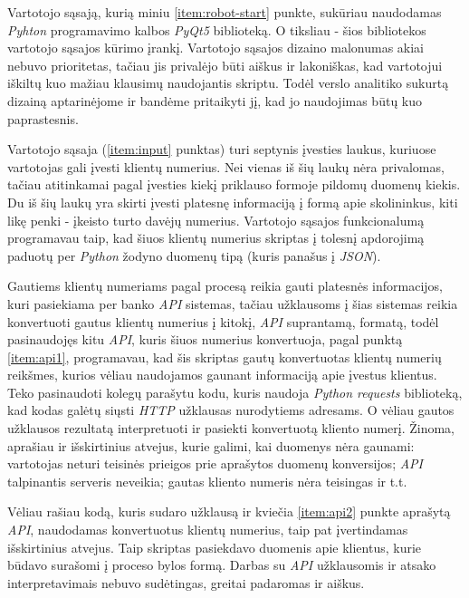 \documentclass{VUMIFPSBakPrakAt}
\begin{document}
\vspace{10pt}
\par
Vartotojo sąsają, kurią miniu \ref{item:robot-start} punkte, sukūriau naudodamas \textit{Pyhton} programavimo kalbos \textit{PyQt5} biblioteką. O tiksliau - šios bibliotekos vartotojo sąsajos kūrimo įrankį. Vartotojo sąsajos dizaino malonumas akiai nebuvo prioritetas, tačiau jis privalėjo būti aiškus ir lakoniškas, kad vartotojui iškiltų kuo mažiau klausimų naudojantis skriptu. Todėl verslo analitiko sukurtą dizainą aptarinėjome ir bandėme pritaikyti jį, kad jo naudojimas būtų kuo paprastesnis.
\par
Vartotojo sąsaja (\ref{item:input} punktas) turi septynis įvesties laukus, kuriuose vartotojas gali įvesti klientų numerius. Nei vienas iš šių laukų nėra privalomas, tačiau atitinkamai pagal įvesties kiekį priklauso formoje pildomų duomenų kiekis. Du iš šių laukų yra skirti įvesti platesnę informaciją į formą apie skolininkus, kiti likę penki - įkeisto turto davėjų numerius. Vartotojo sąsajos funkcionalumą programavau taip, kad šiuos klientų numerius skriptas į tolesnį apdorojimą paduotų per \textit{Python} žodyno duomenų tipą (kuris panašus į \textit{JSON}).
\par
Gautiems klientų numeriams pagal procesą reikia gauti platesnės informacijos, kuri pasiekiama per banko \textit{API} sistemas, tačiau užklausoms į šias sistemas reikia konvertuoti gautus klientų numerius į kitokį, \textit{API} suprantamą, formatą, todėl pasinaudojęs kitu \textit{API}, kuris šiuos numerius konvertuoja, pagal punktą \ref{item:api1}, programavau, kad šis skriptas gautų konvertuotas klientų numerių reikšmes, kurios vėliau naudojamos gaunant informaciją apie įvestus klientus. Teko pasinaudoti kolegų parašytu kodu, kuris naudoja \textit{Python requests} biblioteką, kad kodas galėtų siųsti \textit{HTTP} užklausas nurodytiems adresams. O vėliau gautos užklausos rezultatą interpretuoti ir pasiekti konvertuotą kliento numerį. Žinoma, aprašiau ir išskirtinius atvejus, kurie galimi, kai duomenys nėra gaunami: vartotojas neturi teisinės prieigos prie aprašytos duomenų konversijos; \textit{API} talpinantis serveris neveikia; gautas kliento numeris nėra teisingas ir t.t.
\par
Vėliau rašiau kodą, kuris sudaro užklausą ir kviečia \ref{item:api2} punkte aprašytą \textit{API}, naudodamas konvertuotus klientų numerius, taip pat įvertindamas išskirtinius atvejus. Taip skriptas pasiekdavo duomenis apie klientus, kurie būdavo surašomi į proceso bylos formą. Darbas su \textit{API} užklausomis ir atsako interpretavimais nebuvo sudėtingas, greitai padaromas ir aiškus.
\end{document}
